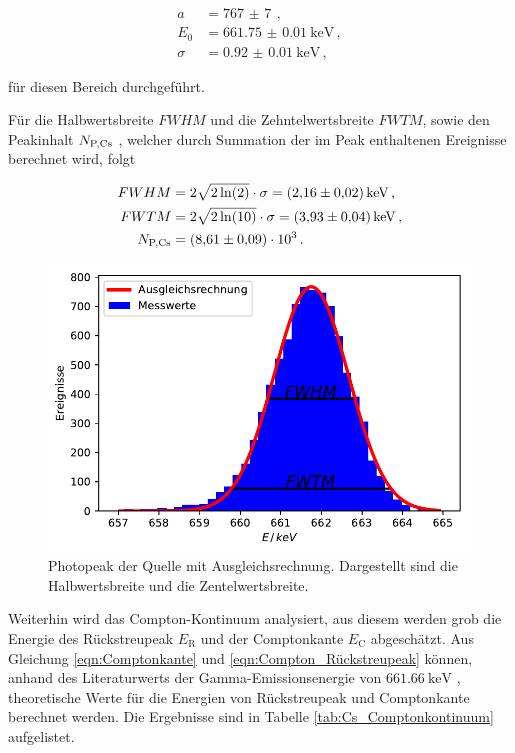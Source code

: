 \begin{align*}
  a &= \SI{767(7)}{} \, , \\
  E_0 &= \SI{661.75(1)}{\kilo\electronvolt} \, , \\
  \sigma &= \SI{0.92(1)}{\kilo\electronvolt} \, ,
\end{align*}

für diesen Bereich durchgeführt.

Für die Halbwertsbreite $FWHM$ und die Zehntelwertsbreite $FWTM$, sowie den Peakinhalt $N_\text{P,\ce{Cs}}$ , welcher durch Summation der im Peak enthaltenen Ereignisse berechnet wird, folgt

\begin{align*}
  FWHM &= 2 \sqrt{2 \ln(2)} \cdot \sigma= \SI{2.16(2)}{\kilo\electronvolt} \, , \\
  FWTM &= 2 \sqrt{2 \ln(10)} \cdot \sigma= \SI{3.93(4)}{\kilo\electronvolt} \, , \\
  N_\text{P,\ce{Cs}} &= \SI{8.61(9)e3}{} \, .
\end{align*}

\begin{figure}[H]
  \centering
  \includegraphics[width = .7\textwidth]{../Plots/Cs_Photopeak.pdf}
  \caption{Photopeak der  Quelle mit Ausgleichsrechnung. Dargestellt sind die Halbwertsbreite und die Zentelwertsbreite.}
  \label{fig:Cs_Photo}
\end{figure}

Weiterhin wird das Compton-Kontinuum analysiert, aus diesem werden grob die Energie des Rückstreupeak $E_\text{R}$ und der Comptonkante $E_\text{C}$ abgeschätzt. Aus Gleichung \eqref{eqn:Comptonkante} und \eqref{eqn:Compton_Rückstreupeak} können,
anhand des Literaturwerts der Gamma-Emissionsenergie von $\SI{661.66}{\kilo\electronvolt}$ \cite{Cs_Emissionsenergie},
theoretische Werte für die Energien von Rückstreupeak und Comptonkante berechnet werden.
Die Ergebnisse sind in Tabelle \ref{tab:Cs_Comptonkontinuum} aufgelistet.

